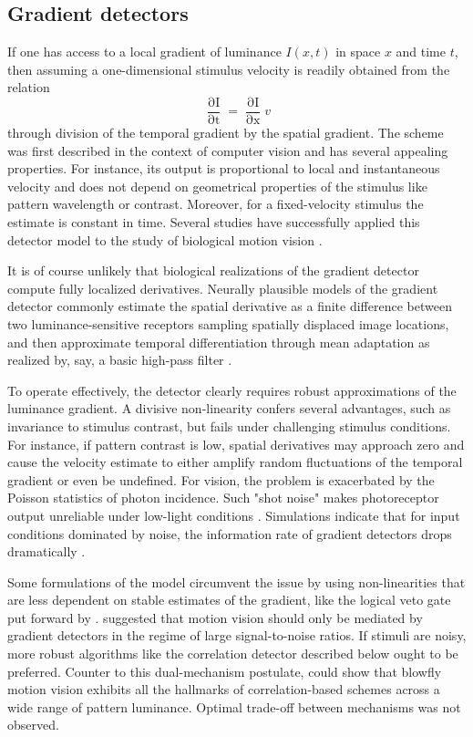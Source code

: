 \subsection{Gradient detectors}
If one has access to a local gradient of luminance $I(x,t)$ in space $x$ and time $t$, then assuming a one-dimensional stimulus velocity is readily obtained from the relation
\begin{equation}
    \frac{\mathop{\partial I}}{\mathop{\partial t}} = \frac{\mathop{\partial I}}{\mathop{\partial x}} v
\end{equation}
through division of the temporal gradient by the spatial gradient. The scheme was first described in the context of computer vision \citep{Limb:1975aa,Fennema:1979aa} and has several appealing properties. For instance, its output is proportional to local and instantaneous velocity and does not depend on geometrical properties of the stimulus like pattern wavelength or contrast. Moreover, for a fixed-velocity stimulus the estimate is constant in time. Several studies have successfully applied this detector model to the study of biological motion vision \citep{Hildreth:1987jt,Johnston:1995aa,Borst:2007gz}.

It is of course unlikely that biological realizations of the gradient detector compute fully localized derivatives. Neurally plausible models of the gradient detector commonly estimate the spatial derivative as a finite difference between two luminance-sensitive receptors sampling spatially displaced image locations, and then approximate temporal differentiation through mean adaptation as realized by, say, a basic high-pass filter \citep{Srinivasasn:1990aa,Borst:2011bq}.

To operate effectively, the detector clearly requires robust approximations of the luminance gradient. A divisive non-linearity confers several advantages, such as invariance to stimulus contrast, but fails under challenging stimulus conditions. For instance, if pattern contrast is low, spatial derivatives may approach zero and cause the velocity estimate to either amplify random fluctuations of the temporal gradient or even be undefined. For vision, the problem is exacerbated by the Poisson statistics of photon incidence. Such "shot noise" makes photoreceptor output unreliable under low-light conditions \citep{Laughlin:1996aa}. Simulations indicate that for input conditions dominated by noise, the information rate of gradient detectors drops dramatically \citep{Borst:2007gz}.

Some formulations of the model circumvent the issue by using non-linearities that are less dependent on stable estimates of the gradient, like the logical veto gate put forward by \citet{Marr:1981aa}. \citet{Potters:1994aa} suggested that motion vision should only be mediated by gradient detectors in the regime of large signal-to-noise ratios. If stimuli are noisy, more robust algorithms like the correlation detector described below ought to be preferred. Counter to this dual-mechanism postulate, \citet{Haag:2004bj} could show that blowfly motion vision exhibits all the hallmarks of correlation-based schemes across a wide range of pattern luminance. Optimal trade-off between mechanisms was not observed.

